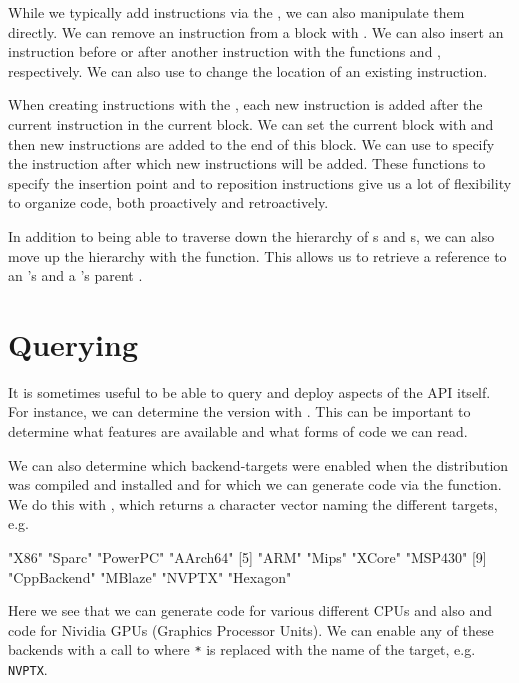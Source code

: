 While we typically add instructions via the , we can
also manipulate them directly.  We can remove an instruction from a
block with .  We can also insert an instruction
before or after another instruction with the functions
 and , respectively.  We can
also use  to change the location of an existing
instruction.

When creating instructions with the , each new
instruction is added after the current instruction in the current
block.  We can set the current block with  and
then new instructions are added to the end of this block.  We can use
 to specify the instruction after which new
instructions will be added.  These functions to specify the insertion
point and to reposition instructions give us a lot of flexibility to
organize code, both proactively and retroactively.


In addition to being able to traverse down the hierarchy of
s and s, we can also move up
the hierarchy with the  function.  This allows us to
retrieve a reference to an 's 
and a 's parent .



\section[Querying LLVM]{Querying \llvm}
It is sometimes useful to be able to query and deploy aspects of the
\llvm{} API itself.  For instance, we can determine the version with
.  This can be important to determine what features
are available and what forms of code we can read.


We can also determine which backend-targets were enabled
when the \llvm{} distribution was compiled and installed
and for which we can generate  code via the 
function.
We do this with , which returns 
a character vector naming the different targets, e.g.
\begin{ROutput}
 [1] "X86"        "Sparc"      "PowerPC"    "AArch64"   
 [5] "ARM"        "Mips"       "XCore"      "MSP430"    
 [9] "CppBackend" "MBlaze"     "NVPTX"      "Hexagon"  
\end{ROutput}
Here we see that we can generate code for various different CPUs
and also \Cpp{} and  code for  Nividia GPUs (Graphics
Processor Units).
We can enable any of these backends with a call to 
 where \texttt{*} is replaced
with the name of the target, e.g. \texttt{NVPTX}.

